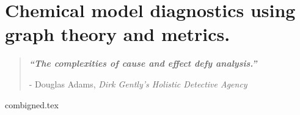 

\chapter{ Chemical model diagnostics using graph theory and metrics.  }\label{ch3}


\blankpage
\restoregeometry
\vspace*{0.15\paperheight}


\begin{center}
\begin{quotation}
  \large{\emph{\textbf{``The complexities of cause and effect defy analysis.''} }  }  \\
  \begin{flushright}
  - Douglas Adams, \textit{Dirk Gently's Holistic Detective Agency}
  \end{flushright}
 \end{quotation}
\end{center}
\doublespacing
\newpage

% 
 
{combigned.tex} 

\chapterbib






